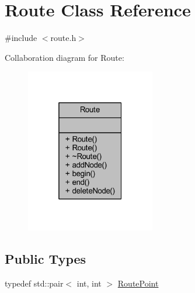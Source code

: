 \hypertarget{class_route}{}\section{Route Class Reference}
\label{class_route}


{\ttfamily \#include $<$route.\+h$>$}



Collaboration diagram for Route\+:
\nopagebreak
\begin{figure}[H]
\begin{center}
\leavevmode
\includegraphics[width=160pt]{class_route__coll__graph}
\end{center}
\end{figure}
\subsection*{Public Types}
\begin{DoxyCompactItemize}
\item 
typedef std\+::pair$<$ int, int $>$ \hyperlink{class_route_a9db7fc1029ed57a38dc7bb0921f82946}{Route\+Point}
\end{DoxyCompactItemize}

